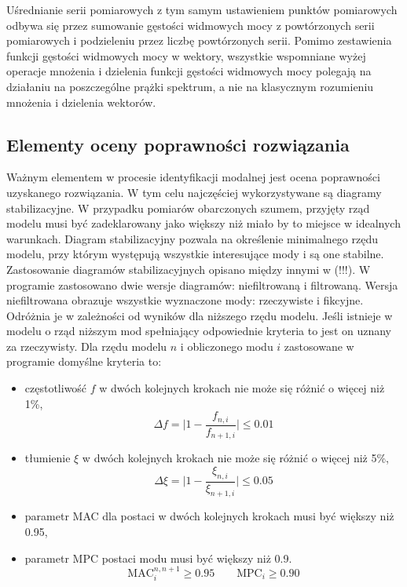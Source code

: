 Uśrednianie serii pomiarowych z tym samym ustawieniem punktów pomiarowych odbywa się przez sumowanie gęstości widmowych mocy z powtórzonych serii pomiarowych i podzieleniu przez liczbę powtórzonych serii. Pomimo zestawienia funkcji gęstości widmowych mocy w wektory, wszystkie wspomniane wyżej operacje mnożenia i dzielenia funkcji gęstości widmowych mocy polegają na działaniu na poszczególne prążki spektrum, a nie na klasycznym rozumieniu mnożenia i dzielenia wektorów. 

\subsection{Elementy oceny poprawności rozwiązania}
Ważnym elementem w procesie identyfikacji modalnej jest ocena poprawności uzyskanego rozwiązania. W tym celu najczęściej wykorzystywane są diagramy stabilizacyjne. W przypadku pomiarów obarczonych szumem, przyjęty rząd modelu musi być zadeklarowany jako większy niż miało by to miejsce w idealnych warunkach. Diagram stabilizacyjny pozwala na określenie minimalnego rzędu modelu, przy którym występują wszystkie interesujące mody i są one stabilne. Zastosowanie diagramów stabilizacyjnych opisano między innymi w (!!!). W programie zastosowano dwie wersje diagramów: niefiltrowaną i filtrowaną. Wersja niefiltrowana obrazuje wszystkie wyznaczone mody: rzeczywiste i fikcyjne. Odróżnia je w zależności od wyników dla niższego rzędu modelu. Jeśli istnieje w modelu o rząd niższym mod spełniający odpowiednie kryteria to jest on uznany za rzeczywisty. Dla rzędu modelu $n$ i obliczonego modu $i$ zastosowane w programie domyślne kryteria to:
\begin{itemize}[noitemsep]
	\item częstotliwość $f$ w dwóch kolejnych krokach nie może się różnić o więcej niż 1\%,
	\begin{equation}\label{eq: stabdiag_crit_freq}
		\Delta f =  \Big| 1-\frac{f_{n,i}}{f_{n+1,i}}\Big|  \le 0.01
	\end{equation}
	\item tłumienie $\xi$ w dwóch kolejnych krokach nie może się różnić o więcej niż 5\%,
		\begin{equation}\label{eq: stabdiag_crit_ksi}
		\Delta \xi =  \Big| 1-\frac{\xi_{n,i}}{\xi_{n+1,i}}\Big|  \le 0.05
	\end{equation}
	\item parametr MAC dla postaci w dwóch kolejnych krokach musi być większy niż 0.95,	
	\item parametr MPC postaci modu musi być większy niż 0.9.
	\begin{equation}\label{eq: stabdiag_crit_MPC_MAC}
		\text{MAC}_i^{n,n+1} \ge 0.95 \qquad \text{MPC}_i \ge 0.90
	\end{equation}
\end{itemize}
